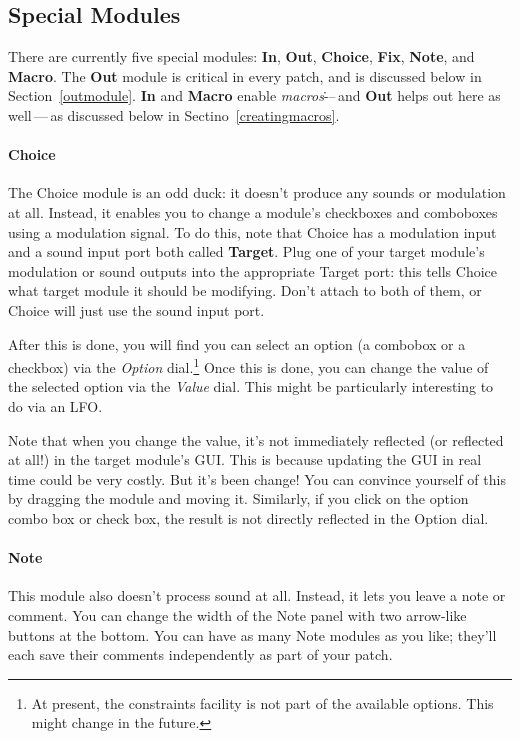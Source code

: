 \documentclass{article}
\begin{document}
\subsection{Special Modules}
\label{specialmodules}

There are currently five special modules: {\bf In}, {\bf Out}, {\bf Choice}, {\bf Fix}, {\bf Note}, and {\bf Macro}.  The {\bf Out} module is critical in every patch, and is discussed below in Section~\ref{outmodule}.  {\bf In} and {\bf Macro} enable {\it macros}\.---\,and {\bf Out} helps out here as well\,---\,as discussed below in Sectino~\ref{creatingmacros}.

\paragraph{Choice}  The Choice module is an odd duck: it doesn't produce any sounds or modulation at all.  Instead, it enables you to change a module's checkboxes and comboboxes using a modulation signal.  To do this, note that Choice has a modulation input and a sound input port both called {\bf Target}.   Plug one of your target module's modulation or sound outputs into the appropriate Target port: this tells Choice what target module it should be modifying.  Don't attach to both of them, or Choice will just use the sound input port.

After this is done, you will find you can select an option (a combobox or a checkbox) via the {\it Option} dial.\footnote{At present, the constraints facility is not part of the available options.  This might change in the future.} Once this is done, you can change the value of the selected option via the {\it Value} dial.  This might be particularly interesting to do via an LFO.

Note that when you change the value, it's not immediately reflected (or reflected at all!) in the target module's GUI.  This is because updating the GUI in real time could be very costly.  But it's been change!  You can convince yourself of this by dragging the module and moving it.  Similarly, if you click on the option combo box or check box, the result is not directly reflected in the Option dial.

\paragraph{Note} This module also doesn't process sound at all. Instead, it lets you leave a note or comment.  You can change the width of the Note panel with two arrow-like buttons at the bottom.   You can have as many Note modules as you like; they'll each save their comments independently as part of your patch.
\end{document}
